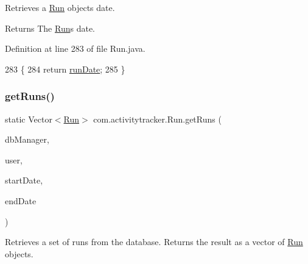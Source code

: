 Retrieves a \mbox{\hyperlink{classcom_1_1activitytracker_1_1_run}{Run}} object\textquotesingle{}s date.

\begin{DoxyReturn}{Returns}
The \mbox{\hyperlink{classcom_1_1activitytracker_1_1_run}{Run}}\textquotesingle{}s date. 
\end{DoxyReturn}


Definition at line 283 of file Run.\+java.


\begin{DoxyCode}
283                              \{
284         \textcolor{keywordflow}{return} \mbox{\hyperlink{classcom_1_1activitytracker_1_1_run_a2f519da043ea384f1ba0d156f4971367}{runDate}};
285     \}
\end{DoxyCode}
\mbox{\label{classcom_1_1activitytracker_1_1_run_a1aa1fb01eabff586e16d88f19f7df743}} 
\subsubsection{\texorpdfstring{get\+Runs()}{getRuns()}}
{\footnotesize\ttfamily static Vector$<$\mbox{\hyperlink{classcom_1_1activitytracker_1_1_run}{Run}}$>$ com.\+activitytracker.\+Run.\+get\+Runs (\begin{DoxyParamCaption}\item[{final \mbox{\hyperlink{classcom_1_1activitytracker_1_1_d_b_manager}{D\+B\+Manager}}}]{db\+Manager,  }\item[{final \mbox{\hyperlink{classcom_1_1activitytracker_1_1_user}{User}}}]{user,  }\item[{final Date}]{start\+Date,  }\item[{final Date}]{end\+Date }\end{DoxyParamCaption})\hspace{0.3cm}{\ttfamily [static]}}

Retrieves a set of runs from the database. Returns the result as a vector of \mbox{\hyperlink{classcom_1_1activitytracker_1_1_run}{Run}} objects.


